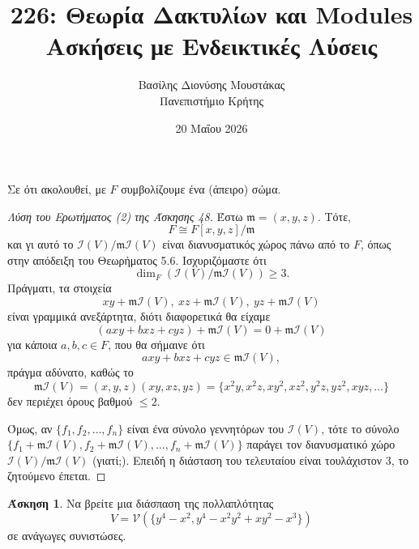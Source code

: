 \documentclass[12pt,a4paper,reqno]{amsart}
\title{226: Θεωρία Δακτυλίων και Modules \\ Ασκήσεις με Ενδεικτικές Λύσεις}
\author[Β.~Δ. Μουστακας]{Βασίλης Διονύσης Μουστάκας \\ Πανεπιστήμιο Κρήτης}
\date{20 Μαΐου 2026}
\theoremstyle{definition}
\newtheorem{exercise}{Άσκηση}
\newcommand{\fm}{\mathfrak{m}}
\newcommand{\iI}{\mathcal{I}}
\newcommand{\vV}{\mathcal{V}}
\begin{document}
\begingroup
\def\uppercasenonmath#1{} %
\let\MakeUppercase\relax %
\maketitle
\endgroup

\setcounter{exercise}{48}
\setcounter{equation}{10}
\renewcommand{\thesubsection}{\thesection.\arabic{subsection}}

Σε ότι ακολουθεί, με $F$ συμβολίζουμε ένα (άπειρο) σώμα.

\begin{proof}[Λύση του Ερωτήματος (2) της Άσκησης 48]
  Έστω $\fm = (x, y, z)$. Τότε, 
  \[
  F \cong F[x,y,z]/\fm
  \]
  και γι αυτό το $\iI(V)/\fm\iI(V)$ είναι διανυσματικός χώρος πάνω από το $F$, όπως στην απόδειξη του Θεωρήματος 5.6. Ισχυριζόμαστε ότι 
  \[
  \dim_F\left(
    \iI(V)/\fm\iI(V)
  \right) \ge 3.
  \]
  Πράγματι, τα στοιχεία 
  \[
  xy + \fm\iI(V), \ 
  xz + \fm\iI(V), \  
  yz + \fm\iI(V)
  \]
  είναι γραμμικά ανεξάρτητα, διότι διαφορετικά θα είχαμε 
  \[
  (axy + bxz + cyz) + \fm\iI(V) = 0 + \fm\iI(V)
  \]
  για κάποια $a, b, c \in F$, που θα σήμαινε ότι 
  \[
  axy + bxz + cyz \in \fm\iI(V),
  \]
  πράγμα αδύνατο, καθώς το 
  \[
  \fm\iI(V) = (x,y,z)(xy, xz, yz) = \{x^2y, x^2z, xy^2, xz^2, y^2z, yz^2, xyz, \dots\}
  \]
  δεν περιέχει όρους βαθμού $\le 2$.

  Όμως, αν $\{f_1, f_2, \dots, f_n\}$ είναι ένα σύνολο γεννητόρων του $\iI(V)$, τότε το σύνολο $\{f_1+\fm\iI(V), f_2+\fm\iI(V), \dots, f_n+\fm\iI(V)\}$ παράγει τον διανυσματικό χώρο $\iI(V)/\fm\iI(V)$ (γιατί;). Επειδή η διάσταση του τελευταίου είναι τουλάχιστον $3$, το ζητούμενο έπεται.
\end{proof}

\begin{exercise}
  Να βρείτε μια διάσπαση της πολλαπλότητας 
  \[      
  V = \vV(\{y^4 - x^2, y^4 - x^2y^2 + xy^2 - x^3\})
  \]   
  σε ανάγωγες συνιστώσες.
\end{exercise}
\end{document}
